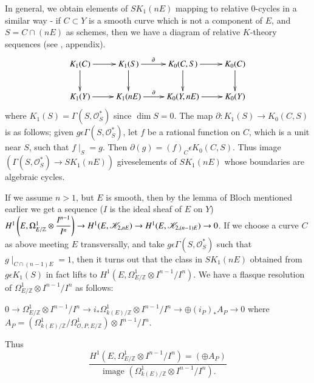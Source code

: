 In general, we obtain elements of $SK_1(nE)$ mapping to relative $0$-cycles in a similar way - if $C\subset Y$ is a smooth curve which is not a component of $E$, and $S=C\cap (nE)$ as schemes, then we have a diagram of relative $K$-theory sequences (see \cite{Coombes}, appendix). 
$$
\xymatrix{K_1(C)\ar[d]\ar[r]&K_1(S)\ar[d]\ar[r]^-{\partial}& K_0\ar[d](C,S)\ar[r]& K_0\ar[d](C)\\
K_1(Y)\ar[r]& K_1(nE)\ar[r]^-{\partial}& K_0(Y, nE)\ar[r]& K_0(Y)}
$$
where $K_1(S)=\Gamma(S, \mathscr{O}^{\ast}_S)$ since $\dim S=0$. The map $\partial:K_1(S)\to K_0(C,S)$ is as follows; given $g\epsilon \Gamma(S, \mathscr{O}^{\ast}_S)$, let $f$ be a rational function on $C$, which is a unit near $S$, such that $f\mid_{S}=g$. Then $\partial(g)=(f)_C\epsilon K_0(C,S)$. Thus image $(\Gamma(S, \mathscr{O}^{\ast}_S)\to SK_1(nE))$ gives\pageoriginale elements of $SK_1(nE)$ whose boundaries are algebraic cycles. 

If we assume $n>1$, but $E$ is smooth, then by the lemma of Bloch mentioned earlier we get a sequence ($I$ is the ideal sheaf of $E$ on $Y$)$H^{1}\\\left(E, \Omega^{1}_{E/\mathbb{Z}}\otimes \dfrac{I^{n-1}}{I^{n}}\right)\to H^{1}(E, \mathscr{K}_{2, nE})\to H^{1}(E, \mathscr{K}_{2, (n-1)E})\to 0$. If we choose a curve $C$ as above meeting $E$ transversally, and take $g\epsilon \Gamma\left(S, \mathscr{O}^{\ast}_S\right)$ such that $g\mid_{C \cap (n-1)E}=1$, then it turns out that the class in $SK_1(nE)$ obtained from $g\epsilon K_1(S)$ in fact lifts to $H^{1}\left(E, \Omega^{1}_{E/\mathbb{Z}}\otimes I^{n-1}/I^{n}\right)$. We have a flasque resolution of $\Omega^{1}_{E/\mathbb{Z}}\otimes I^{n-1}/I^{n}$ as follows: 

$0\to \Omega^{1}_{E/\mathbb{Z}}\otimes I^{n-1}/I^{n}\to i_{\ast}\Omega^{1}_{k(E)/\mathbb{Z}}\otimes I^{n-1}/I^{n}\to \oplus (i_P)_{\ast}A_P\to 0 $ where $A_P=\left(\Omega^{1}_{k(E)/\mathbb{Z}}/\Omega^{1}_{\mathscr{O},P,E/\mathbb{Z}}\right)\otimes I^{n-1}/I^{n}$.

Thus
$$
\dfrac{H^{1}\left(E, \Omega^{1}_{E/\mathbb{Z}}\otimes I^{n-1}/I^{n}\right)=(\oplus A_P)}{\text{ image }\left(\Omega^{1}_{k(E)/\mathbb{Z}}\otimes I^{n-1}/I^{n}\right).}
$$


